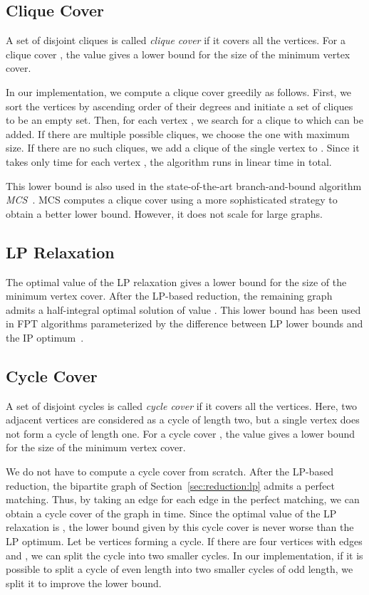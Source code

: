 \documentclass[11pt]{article}
\begin{document}
\subsection{Clique Cover}\label{sec:lower_bounds:clique}
A set of disjoint cliques  is called \emph{clique cover} if it covers all the vertices.
For a clique cover , the value  gives a lower bound for
the size of the minimum vertex cover.

In our implementation, we compute a clique cover greedily as follows.
First, we sort the vertices by ascending order of their degrees and initiate a set of cliques  to be an
empty set.
Then, for each vertex , we search for a clique  to which  can be added.
If there are multiple possible cliques, we choose the one with maximum size.
If there are no such cliques, we add a clique of the single vertex  to .
Since it takes only  time for each vertex , the algorithm runs in linear time in total.

This lower bound is also used in the state-of-the-art branch-and-bound algorithm \emph{MCS}~\cite{clique/mcs_walcom10}.
MCS computes a clique cover using a more sophisticated strategy to obtain a better lower bound.
However, it does not scale for large graphs.

\subsection{LP Relaxation}\label{sec:lower_bounds:lp}
The optimal value of the LP relaxation gives a lower bound for the size of the minimum vertex cover.
After the LP-based reduction, the remaining graph admits a half-integral optimal solution of value .
This lower bound has been used in FPT algorithms parameterized by the difference between LP lower bounds and the IP
optimum~\cite{DBLP:journals/corr/abs-1203-0833,bip2/iwata14}.

\subsection{Cycle Cover}\label{sec:lower_bounds:cycle}
A set of disjoint cycles  is called \emph{cycle cover} if it covers all the vertices.
Here, two adjacent vertices are considered as a cycle of length two, but a single vertex does not form a cycle of
length one.
For a cycle cover , the value  gives a
lower bound for the size of the minimum vertex cover.

We do not have to compute a cycle cover from scratch.
After the LP-based reduction, the bipartite graph  of Section~\ref{sec:reduction:lp} admits a perfect
matching.
Thus, by taking an edge  for each edge  in the perfect matching, we can obtain a cycle cover of the graph
 in  time.
Since the optimal value of the LP relaxation is , the lower bound given by
this cycle cover is never worse than the LP optimum.
Let  be vertices forming a cycle.
If there are four vertices  with edges  and , we can split the cycle into two smaller cycles.
In our implementation, if it is possible to split a cycle of even length into two smaller cycles
of odd length, we split it to improve the lower bound.
\end{document}
